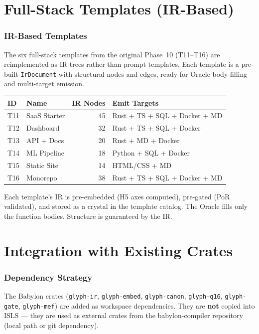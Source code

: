 \documentclass[11pt,a4paper,twoside]{article}
\theoremstyle{definition}
\theoremstyle{plain}
\theoremstyle{remark}
\newcommand{\ISLS}{\textsf{ISLS}}
\begin{document}
\part{Full-Stack Templates (IR-Based)}\label{part:templates}

\section{IR-Based Templates}\label{sec:irtemplates}

The six full-stack templates from the original Phase~10 (T11--T16) are
reimplemented as IR trees rather than prompt templates. Each template
is a pre-built \texttt{IrDocument} with structural nodes and edges,
ready for Oracle body-filling and multi-target emission.

\begin{tabularx}{\textwidth}{l l r X}
\toprule
\textbf{ID} & \textbf{Name} & \textbf{IR Nodes} &
  \textbf{Emit Targets} \\
\midrule
T11 & SaaS Starter & 45 & Rust + TS + SQL + Docker + MD \\
T12 & Dashboard & 32 & Rust + TS + SQL + Docker \\
T13 & API + Docs & 20 & Rust + MD + Docker \\
T14 & ML Pipeline & 18 & Python + SQL + Docker \\
T15 & Static Site & 14 & HTML/CSS + MD \\
T16 & Monorepo & 38 & Rust + TS + SQL + Docker + MD \\
\bottomrule
\end{tabularx}

Each template's IR is pre-embedded (H5 axes computed), pre-gated
(PoR validated), and stored as a crystal in the template catalog.
The Oracle fills only the function bodies. Structure is guaranteed
by the IR.


\part{Integration with Existing Crates}\label{part:integration}

\section{Dependency Strategy}\label{sec:deps}

The Babylon crates (\texttt{glyph-ir}, \texttt{glyph-embed},
\texttt{glyph-canon}, \texttt{glyph-q16}, \texttt{glyph-gate},
\texttt{glyph-mef}) are added as workspace dependencies. They are
\textbf{not} copied into \ISLS{} --- they are used as external crates
from the babylon-compiler repository (local path or git dependency).
\end{document}
